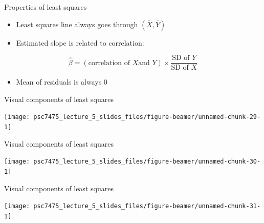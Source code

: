 \documentclass[
  ignorenonframetext,
]{beamer}
\providecommand{\tightlist}{%
  \setlength{\itemsep}{0pt}\setlength{\parskip}{0pt}}
\begin{document}
\begin{frame}{Properties of least squares}
\label{properties-of-least-squares}
\begin{itemize}
\tightlist
\item
  Least squares line always goes through \((\bar{X},\bar{Y})\)
\item
  Estimated slope is related to correlation:
\end{itemize}

\[
\hat{\beta} = (\textrm{correlation of } X \textrm{and } Y) \times \frac{\textrm{SD of }Y}{\textrm{SD of }X}
\]

\begin{itemize}
\tightlist
\item
  Mean of residuals is always 0
\end{itemize}
\end{frame}

\begin{frame}{Visual components of least squares}
\label{visual-components-of-least-squares}
\begin{center}\texttt{[image: psc7475\_lecture\_5\_slides\_files/figure-beamer/unnamed-chunk-29-1]} \end{center}
\end{frame}

\begin{frame}{Visual components of least squares}
\label{visual-components-of-least-squares-1}
\begin{center}\texttt{[image: psc7475\_lecture\_5\_slides\_files/figure-beamer/unnamed-chunk-30-1]} \end{center}
\end{frame}

\begin{frame}{Visual components of least squares}
\label{visual-components-of-least-squares-2}
\begin{center}\texttt{[image: psc7475\_lecture\_5\_slides\_files/figure-beamer/unnamed-chunk-31-1]} \end{center}
\end{frame}
\end{document}
